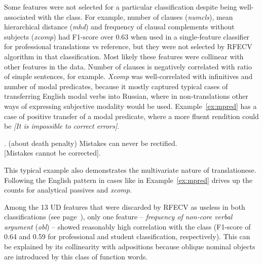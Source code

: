 Some features were not selected for a particular classification despite being well-associated with the class. For example, number of clauses (\textit{numcls}), mean hierarchical distance (\textit{mhd}) and frequency of clausal complements without subjects (\textit{xcomp}) had F1-score over 0.63 when used in a single-feature classifier for professional translations vs reference, but they were not selected by RFECV algorithm in that classification. Most likely these features were collinear with other features in the data. Number of clauses is negatively correlated with ratio of simple sentences, for example. \textit{Xcomp} was well-correlated with infinitives and number of modal predicates, because it mostly captured typical cases of transferring English modal verbs into Russian, where in non-translations other ways of expressing subjective modality would be used. Example~\ref{ex:mpred} has a case of positive transfer of a modal predicate, where a more fluent rendition could be  \textit{[It is impossible to correct errors]}. 

\ex. \label{ex:mpred}\hspace{1pt}
(about death penalty) Mistakes can never be rectified.\\
 [Mistakes cannot be corrected].

This typical example also demonstrates the multivariate nature of translationese. Following the English pattern in cases like in Example~\ref{ex:mpred} drives up the counts for analytical passives and \textit{xcomp}.

Among the 13 UD features that were discarded by RFECV as useless in both classifications (see page~\pageref{pg:rfe_useless}), only one feature -- \textit{frequency of non-core verbal argument} (\textit{obl}) -- showed reasonably high correlation with the class (F1-score of 0.64 and 0.59 for professional and student classification, respectively). This can be explained by its collinearity with adpositions because oblique nominal objects are introduced by this class of function words. 




